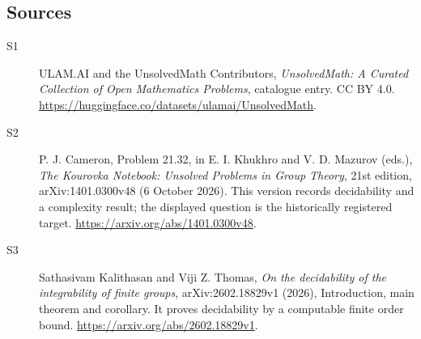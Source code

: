 \documentclass[11pt]{article}
\begin{document}
\subsection{Sources}
\begin{description}
\item[\hypertarget{source:statement:1}{S1}] ULAM.AI and the UnsolvedMath Contributors, \emph{UnsolvedMath: A Curated Collection of Open Mathematics Problems}, catalogue entry. CC BY 4.0. \url{https://huggingface.co/datasets/ulamai/UnsolvedMath}.
\item[\hypertarget{source:statement:2}{S2}] P. J. Cameron, Problem 21.32, in E. I. Khukhro and V. D. Mazurov (eds.), \emph{The Kourovka Notebook: Unsolved Problems in Group Theory}, 21st edition, arXiv:1401.0300v48 (6 October 2026). This version records decidability and a complexity result; the displayed question is the historically registered target. \url{https://arxiv.org/abs/1401.0300v48}.
\item[\hypertarget{source:statement:3}{S3}] Sathasivam Kalithasan and Viji Z. Thomas, \emph{On the decidability of the integrability of finite groups}, arXiv:2602.18829v1 (2026), Introduction, main theorem and corollary. It proves decidability by a computable finite order bound. \url{https://arxiv.org/abs/2602.18829v1}.
\end{description}
\label{end:statement}
\end{document}
